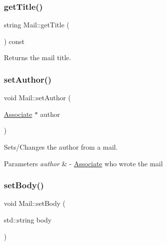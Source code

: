 \mbox{\label{classMail_aa51a6657dd3e594e8638ac4486660675}} 
\subsubsection{\texorpdfstring{get\+Title()}{getTitle()}}
{\footnotesize\ttfamily string Mail\+::get\+Title (\begin{DoxyParamCaption}{ }\end{DoxyParamCaption}) const}



Returns the mail title. 

\mbox{\label{classMail_acec00cbed8830746de97efeca4561dd8}} 
\subsubsection{\texorpdfstring{set\+Author()}{setAuthor()}}
{\footnotesize\ttfamily void Mail\+::set\+Author (\begin{DoxyParamCaption}\item[{\hyperlink{classAssociate}{Associate} $\ast$}]{author }\end{DoxyParamCaption})}



Sets/\+Changes the author from a mail. 


\begin{DoxyParams}{Parameters}
{\em author} & -\/ \hyperlink{classAssociate}{Associate} who wrote the mail \\
\hline
\end{DoxyParams}
\mbox{\label{classMail_a85ddf08af27648cc0835d66bd6b08dde}} 
\subsubsection{\texorpdfstring{set\+Body()}{setBody()}}
{\footnotesize\ttfamily void Mail\+::set\+Body (\begin{DoxyParamCaption}\item[{std\+::string}]{body }\end{DoxyParamCaption})}



